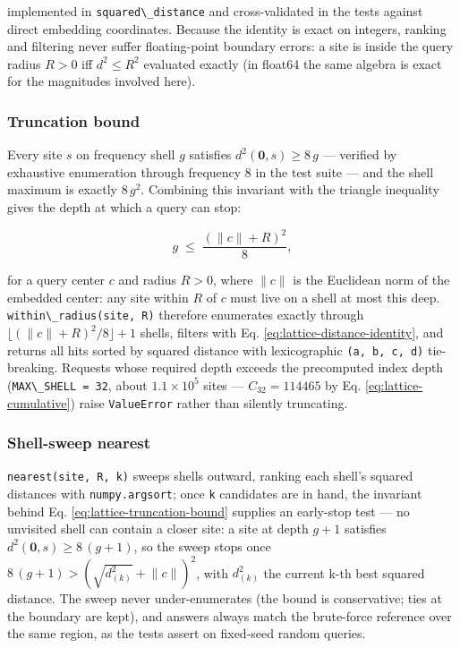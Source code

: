 \documentclass[
  10pt,
]{article}
\newcommand{\passthrough}[1]{#1}
\renewcommand{\texttt}[1]{%
    \colorbox{codebg}{\color{codefg}\ttfamily #1}%
}
\begin{document}
implemented in \passthrough{\lstinline!squared\_distance!} and
cross-validated in the tests against direct embedding coordinates.
Because the identity is exact on integers, ranking and filtering never
suffer floating-point boundary errors: a site is inside the query radius
\(R > 0\) iff \(d^{2} \le R^{2}\) evaluated exactly (in float64 the same
algebra is exact for the magnitudes involved here).

\subsubsection{Truncation bound}\label{truncation-bound}

Every site \(s\) on frequency shell \(g\) satisfies
\(d^{2}(\mathbf{0}, s) \ge 8\,g\) --- verified by exhaustive enumeration
through frequency 8 in the test suite --- and the shell maximum is
exactly \(8\,g^{2}\). Combining this invariant with the triangle
inequality gives the depth at which a query can stop:

\begin{equation}\label{eq:lattice-truncation-bound}
g \;\leq\; \frac{\left(\lVert c \rVert + R\right)^{2}}{8},
\end{equation}

for a query center \(c\) and radius \(R > 0\), where \(\lVert c \rVert\)
is the Euclidean norm of the embedded center: any site within \(R\) of
\(c\) must live on a shell at most this deep.
\passthrough{\lstinline!within\_radius(site, R)!} therefore enumerates
exactly through \(\lfloor (\lVert c \rVert + R)^{2} / 8 \rfloor + 1\)
shells, filters with Eq. \eqref{eq:lattice-distance-identity}, and
returns all hits sorted by squared distance with lexicographic
\passthrough{\lstinline!(a, b, c, d)!} tie-breaking. Requests whose
required depth exceeds the precomputed index depth
(\passthrough{\lstinline!MAX\_SHELL = 32!}, about \(1.1 \times 10^{5}\)
sites --- \(C_{32} = 114465\) by Eq. \eqref{eq:lattice-cumulative})
raise \passthrough{\lstinline!ValueError!} rather than silently
truncating.

\subsubsection{\texorpdfstring{Shell-sweep
\texttt{nearest}}{Shell-sweep nearest}}\label{shell-sweep-nearest}

\passthrough{\lstinline!nearest(site, R, k)!} sweeps shells outward,
ranking each shell's squared distances with
\passthrough{\lstinline!numpy.argsort!}; once
\passthrough{\lstinline!k!} candidates are in hand, the invariant behind
Eq. \eqref{eq:lattice-truncation-bound} supplies an early-stop test ---
no unvisited shell can contain a closer site: a site at depth \(g + 1\)
satisfies \(d^{2}(\mathbf{0}, s) \ge 8\,(g+1)\), so the sweep stops once
\(8\,(g+1) > (\sqrt{d^{2}_{(k)}} + \lVert c \rVert)^{2}\), with
\(d^{2}_{(k)}\) the current k-th best squared distance. The sweep never
under-enumerates (the bound is conservative; ties at the boundary are
kept), and answers always match the brute-force reference over the same
region, as the tests assert on fixed-seed random queries.
\end{document}
